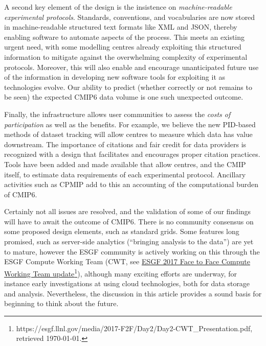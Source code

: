 \documentclass[gmd,manuscript]{copernicus}
\begin{document}
A second key element of the design is the insistence on
\emph{machine-readable experimental protocols}. Standards,
conventions, and vocabularies are now stored in machine-readable
structured text formats like XML and JSON, thereby enabling software
to automate aspects of the process. This meets an existing urgent
need, with some modelling centres already exploiting this structured
information to mitigate against the overwhelming complexity of
experimental protocols. Moreover, this will also enable and encourage
unanticipated future use of the information in developing new software
tools for exploiting it as technologies evolve. Our ability to predict
(whether correctly or not remains to be seen) the expected CMIP6 data
volume is one such unexpected outcome.

Finally, the infrastructure allows user communities to assess the
\emph{costs of participation} as well as the benefits. For example, we
believe the new PID-based methods of dataset tracking will allow
centres to measure which data has value downstream. The importance of
citations and fair credit for data providers is recognized with a
design that facilitates and encourages proper citation practices.
Tools have been added and made available that allow centres, and the
CMIP itself, to estimate data requirements of each experimental
protocol. Ancillary activities such as CPMIP add to this an accounting
of the computational burden of CMIP6.

Certainly not all issues are resolved, and the validation of some of
our findings will have to await the outcome of CMIP6. There is no
community consensus on some proposed design elements, such as standard
grids. Some features long promised, such as server-side analytics
(``bringing analysis to the data'') are yet to mature, however the
ESGF community is actively working on this through the ESGF Compute
Working Team (CWT, see
\href{https://esgf.llnl.gov/media/2017-F2F/Day2/Day2-CWT_Presentation.pdf}{ESGF
  2017 Face to Face Compute Working Team
  update}\footnote{https://esgf.llnl.gov/media/2017-F2F/Day2/Day2-CWT\_Presentation.pdf,
  retrieved \today.}), although many exciting efforts are underway,
for instance early investigations at using cloud technologies, both
for data storage and analysis. Nevertheless, the discussion in this
article provides a sound basis for beginning to think about the
future.
\end{document}

